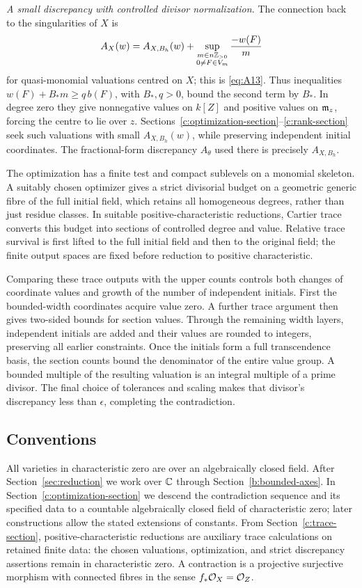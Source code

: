 \smallskip\noindent
\emph{A small discrepancy with controlled divisor normalization.}
The connection back to the singularities of $X$ is
\[
 A_X(w)=A_{X,B_h}(w)+
       \sup_{\substack{m\in n\mathbb Z_{>0}\\0\ne F\in V_m}}
                          \frac{-w(F)}m
\]
for quasi-monomial valuations centred on $X$; this is \eqref{eq:A13}.
Thus inequalities
$w(F)+B_*m\ge q\,b(F)$, with $B_*,q>0$, bound the second term by
$B_*$. In degree zero they give nonnegative values on $k[Z]$ and
positive values on $\mathfrak m_z$, forcing the centre to lie over $z$.
Sections~\ref{c:optimization-section}--\ref{c:rank-section} seek such
valuations with small $A_{X,B_h}(w)$, while preserving independent
initial coordinates. The fractional-form discrepancy $A_\theta$ used
there is precisely $A_{X,B_h}$.

The optimization has a finite test and compact sublevels on a monomial
skeleton. A suitably chosen optimizer gives a strict divisorial budget on a
geometric generic fibre of the full initial field, which retains all
homogeneous degrees, rather than just residue classes. In suitable
positive-characteristic reductions, Cartier trace converts this budget
into sections of controlled degree and value.
Relative trace survival is first lifted to the full initial field and
then to the original field; the finite output spaces are fixed before
reduction to positive characteristic.

Comparing these trace outputs with the upper counts controls both changes
of coordinate values and growth of the number of independent initials.
First the bounded-width coordinates acquire value zero. A further trace
argument then gives two-sided bounds for section values. Through the
remaining width layers, independent initials are added and their values
are rounded to integers, preserving all earlier constraints. Once the
initials form a full transcendence basis, the section counts bound the
denominator of the entire value group. A bounded multiple of the resulting
valuation is an integral multiple of a prime divisor. The final choice of
tolerances and scaling makes that divisor's discrepancy less than
$\epsilon$, completing the contradiction.

\subsection{Conventions}

All varieties in characteristic zero are over an algebraically closed field.
After Section~\ref{sec:reduction} we work over $\mathbb C$ through
Section~\ref{b:bounded-axes}. In Section~\ref{c:optimization-section} we
descend the contradiction sequence and its specified data to a countable
algebraically closed field of characteristic zero; later constructions allow
the stated extensions of constants. From Section~\ref{c:trace-section},
positive-characteristic reductions are auxiliary trace calculations on
retained finite data: the chosen valuations, optimization, and strict
discrepancy assertions remain in characteristic zero. A contraction
is a projective surjective morphism with connected fibres in the sense
$f_*\mathcal O_X=\mathcal O_Z$.


